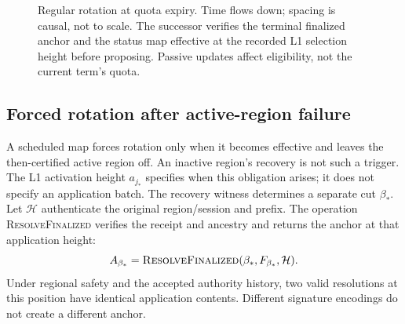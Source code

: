 \documentclass[11pt,a4paper,onecolumn]{article}
\newcommand{\Proc}[1]{\textnormal{\textsc{#1}}}
\begin{document}
\begin{figure}[htbp]\centering

\caption{Regular rotation at quota expiry. Time flows down; spacing is
causal, not to scale. The successor verifies the terminal finalized anchor
and the status map effective at the recorded L1 selection height before
proposing. Passive updates affect
eligibility, not the current term's quota.}
\label{fig:regular}
\end{figure}
\FloatBarrier

\subsection{Forced rotation after active-region failure}\label{sec:forced}
A scheduled map forces rotation only when it becomes effective and leaves
the then-certified active region off. An inactive region's recovery is not
such a trigger. The L1 activation height $a_{j_*}$ specifies when this
obligation arises; it does not specify an application batch.
The recovery witness determines a separate cut $\beta_*$.
Let $\mathcal H$ authenticate the original region/session and prefix.
The operation \Proc{ResolveFinalized} verifies the receipt and ancestry
and returns the anchor at that application height:
\[
 A_{\beta_*}=\Proc{ResolveFinalized}(\beta_*,F_{\beta_*},\mathcal H).
\]
Under regional safety and the accepted authority history, two valid
resolutions at this position have identical application contents.
Different signature encodings do not create a different anchor.
\end{document}
